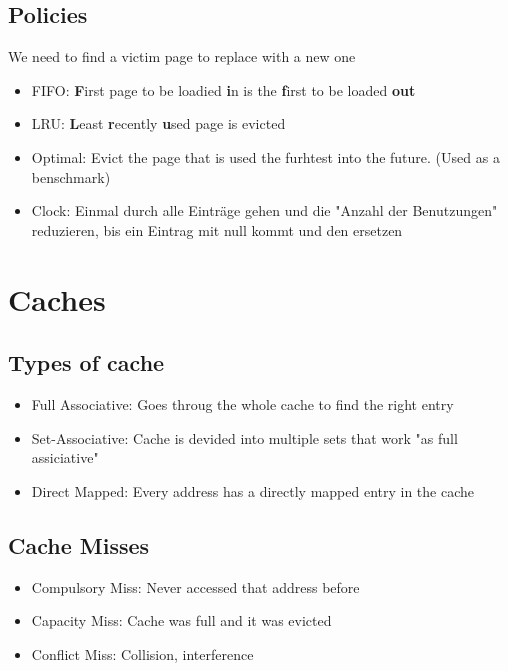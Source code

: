 \documentclass{kit}
\begin{document}
    \subsection{Policies}
      We need to find a victim page to replace with a new one
      \begin{itemize}
        \item FIFO: \textbf{F}irst page to be loadied \textbf{i}n is the \textbf{f}irst to be loaded \textbf{out}
        \item LRU: \textbf{L}east \textbf{r}ecently \textbf{u}sed page is evicted
        \item Optimal: Evict the page that is used the furhtest into the future. (Used as a benschmark)
        \item Clock: Einmal durch alle Einträge gehen und die "Anzahl der Benutzungen" reduzieren, bis ein Eintrag mit 
          null kommt und den ersetzen
      \end{itemize}
\section{Caches}
  \subsection{Types of cache}
    \begin{itemize}
      \item Full Associative: Goes throug the whole cache to find the right entry
      \item Set-Associative: Cache is devided into multiple sets that work "as full assiciative"
      \item Direct Mapped: Every address has a directly mapped entry in the cache
    \end{itemize}
  \subsection{Cache Misses}
    \begin{itemize}
      \item Compulsory Miss: Never accessed that address before
      \item Capacity Miss: Cache was full and it was evicted
      \item Conflict Miss: Collision, interference
    \end{itemize}
\end{document}
